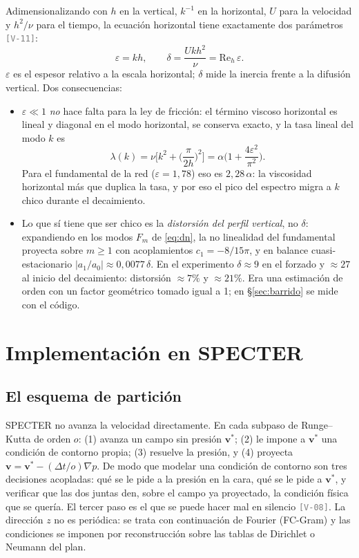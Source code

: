 \documentclass[11pt,a4paper]{article}
\newcommand{\etq}[1]{\textcolor{gray}{\texttt{[#1]}}}
\begin{document}
Adimensionalizando con $h$ en la vertical, $k^{-1}$ en la horizontal, $U$ para la
velocidad y $h^2/\nu$ para el tiempo, la ecuación horizontal tiene exactamente dos
parámetros \etq{V-11}:
\begin{equation}
  \varepsilon=kh,\qquad \delta=\frac{Ukh^2}{\nu}=\mathrm{Re}_h\,\varepsilon .
\end{equation}
$\varepsilon$ es el espesor relativo a la escala horizontal; $\delta$ mide la inercia
frente a la difusión vertical. Dos consecuencias:
\begin{itemize}
  \item $\varepsilon\ll1$ \emph{no} hace falta para la ley de fricción: el término viscoso
  horizontal es lineal y diagonal en el modo horizontal, se conserva exacto, y la tasa
  lineal del modo $k$ es
  \begin{equation}
    \lambda(k)=\nu\Big[k^2+\Big(\frac{\pi}{2h}\Big)^2\Big]=\alpha\Big(1+\frac{4\varepsilon^2}{\pi^2}\Big).
    \label{eq:lamk}
  \end{equation}
  Para el fundamental de la red ($\varepsilon=1{,}78$) eso es $2{,}28\,\alpha$: la
  viscosidad horizontal más que duplica la tasa, y por eso el pico del espectro migra a
  $k$ chico durante el decaimiento.
  \item Lo que sí tiene que ser chico es la \emph{distorsión del perfil vertical}, no
  $\delta$: expandiendo en los modos $F_m$ de \eqref{eq:dn}, la no linealidad del
  fundamental proyecta sobre $m\ge1$ con acoplamientos $c_1=-8/15\pi$, y en balance
  cuasi-estacionario $|a_1/a_0|\approx0{,}0077\,\delta$. En el experimento
  $\delta\approx9$ en el forzado y $\approx27$ al inicio del decaimiento: distorsión
  $\approx7\%$ y $\approx21\%$. Era una estimación de orden con un factor geométrico
  tomado igual a 1; en §\ref{sec:barrido} se mide con el código.
\end{itemize}

\section{Implementación en SPECTER}
\label{sec:implementacion}

\subsection{El esquema de partición}

SPECTER \cite{fontana2020} no avanza la velocidad directamente. En cada subpaso de
Runge--Kutta de orden $o$: (1) avanza un campo sin presión $\boldsymbol v^*$; (2) le impone
a $\boldsymbol v^*$ una condición de contorno propia; (3) resuelve la presión, y (4)
proyecta $\boldsymbol v=\boldsymbol v^*-(\Delta t/o)\nabla p$. De modo que modelar una
condición de contorno son tres decisiones acopladas: qué se le pide a la presión en la
cara, qué se le pide a $\boldsymbol v^*$, y verificar que las dos juntas den, sobre el
campo ya proyectado, la condición física que se quería. El tercer paso es el que se
puede hacer mal en silencio \etq{V-08}. La dirección $z$ no es periódica: se trata con
continuación de Fourier (FC-Gram) y las condiciones se imponen por reconstrucción sobre
las tablas de Dirichlet o Neumann del plan.
\end{document}
